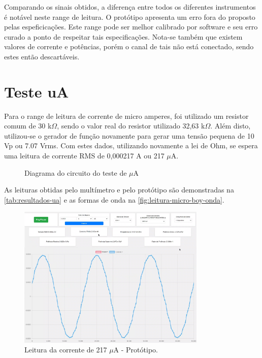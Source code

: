 Comparando os sinais obtidos, a diferença entre todos os diferentes instrumentos é notável neste range de leitura. O protótipo apresenta um erro fora do proposto pelas espeficicações. Este range pode ser melhor calibrado por software e seu erro curado a ponto de respeitar tais especificações. Nota-se também que existem valores de corrente e potências, porém o canal de tais não está conectado, sendo estes então descartáveis.

\section{Teste uA}\label{teste-ua}

Para o range de leitura de corrente de micro amperes, foi utilizado um resistor comum de 30 k$\Omega$, sendo o valor real do resistor utilizado 32,63 k$\Omega$. Além disto, utilizou-se o gerador de função novamente para gerar uma tensão pequena de 10 Vp ou 7.07 Vrms. Com estes dados, utilizando novamente a lei de Ohm, se espera uma leitura de corrente RMS de 0,000217 A ou 217 $\mu$A.

\begin{figure}[htb!]
    \caption{Diagrama do circuito do teste de $\mu$A}
    \label{fig:circ-ua}
    \fonte{}
\end{figure}

As leituras obtidas pelo multímetro e pelo protótipo são demonstradas na \autoref{tab:resultados-ua} e as formas de onda na \autoref{fig:leitura-micro-boy-onda}.

\begin{figure}[htb!]
    \caption{Leitura da corrente de 217 $\mu$A - Protótipo.}
    \label{fig:leitura-micro-boy-onda}
    \includegraphics[width=0.8\textwidth]{figuras/leitura-micro-boy-onda.png}
    \fonte{}
\end{figure}

